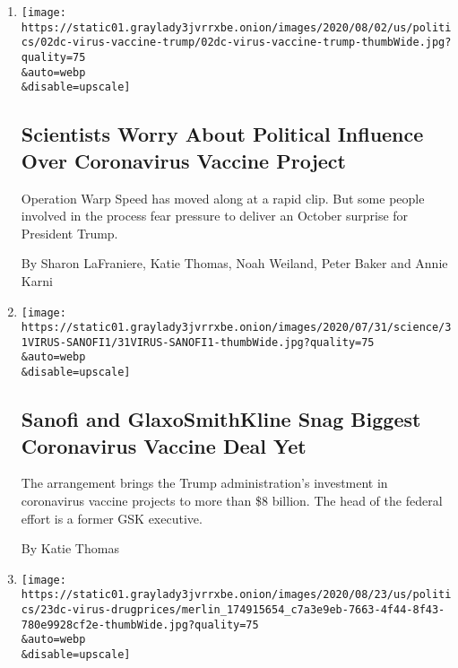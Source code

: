 \begin{enumerate}
\def\labelenumi{\arabic{enumi}.}
\item
  \href{/2020/08/02/us/politics/coronavirus-vaccine.html}{}

  \texttt{[image: https://static01.graylady3jvrrxbe.onion/images/2020/08/02/us/politics/02dc-virus-vaccine-trump/02dc-virus-vaccine-trump-thumbWide.jpg?quality=75\\\&auto=webp\\\&disable=upscale]}

  \hypertarget{scientists-worry-about-political-influence-over-coronavirus-vaccine-project}{%
  \subsection{Scientists Worry About Political Influence Over
  Coronavirus Vaccine
  Project}\label{scientists-worry-about-political-influence-over-coronavirus-vaccine-project}}

  Operation Warp Speed has moved along at a rapid clip. But some people
  involved in the process fear pressure to deliver an October surprise
  for President Trump.

  By Sharon LaFraniere, Katie Thomas, Noah Weiland, Peter Baker and
  Annie Karni
\item
  \href{/2020/07/31/health/covid-19-vaccine-sanofi-gsk.html}{}

  \texttt{[image: https://static01.graylady3jvrrxbe.onion/images/2020/07/31/science/31VIRUS-SANOFI1/31VIRUS-SANOFI1-thumbWide.jpg?quality=75\\\&auto=webp\\\&disable=upscale]}

  \hypertarget{sanofi-and-glaxosmithkline-snag-biggest-coronavirus-vaccine-deal-yet}{%
  \subsection{Sanofi and GlaxoSmithKline Snag Biggest Coronavirus
  Vaccine Deal
  Yet}\label{sanofi-and-glaxosmithkline-snag-biggest-coronavirus-vaccine-deal-yet}}

  The arrangement brings the Trump administration's investment in
  coronavirus vaccine projects to more than \$8 billion. The head of the
  federal effort is a former GSK executive.

  By Katie Thomas
\item
  \href{/2020/07/24/us/politics/trump-drug-prices-coronavirus.html}{}

  \texttt{[image: https://static01.graylady3jvrrxbe.onion/images/2020/08/23/us/politics/23dc-virus-drugprices/merlin\_174915654\_c7a3e9eb-7663-4f44-8f43-780e9928cf2e-thumbWide.jpg?quality=75\\\&auto=webp\\\&disable=upscale]}


\end{enumerate}
